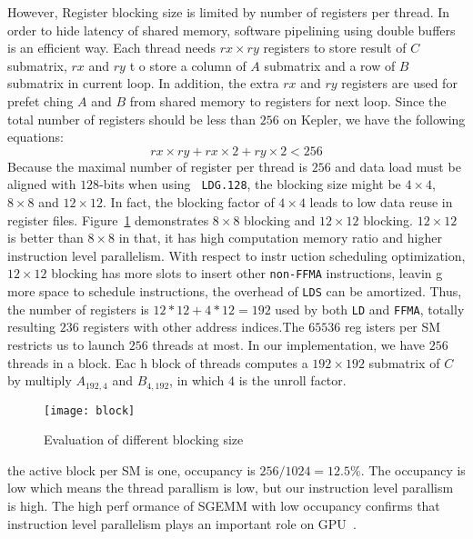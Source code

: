 However, Register blocking size is limited by number of registers per thread. 
In order to hide latency of shared memory, software pipelining using double
buffers is an efficient way. Each thread needs $rx\times ry$ registers to store result of $C$ submatrix, $rx$ and $ry$ t
o store a column of $A$
submatrix and a row of $B$ submatrix in current loop. In addition, the extra $rx$ and $ry$ registers are used for prefet
ching $A$ and $B$ from shared memory to
registers for next loop. Since the total number of registers should be less than $256$ on Kepler, we have the following 
equations:
\begin{equation}
    rx\times ry + rx\times 2 + ry\times 2 < 256
\label{f_register}
\end{equation}
Because the maximal number of register per thread is $256$ and data load must be aligned with $128$-bits when using {\tt
 LDG.128}, the blocking size might be $4\times 4$, $8\times 8$ and $12\times 12$. In fact, the blocking factor of 
 $4\times 4$ leads to low data reuse in register files. Figure~\ref{fig:block} demonstrates $8\times8$ blocking and 
 $12\times12$ blocking. $12\times12$ is better than
$8\times8$ in that, it has high computation memory ratio and higher instruction level parallelism. With respect to instr
uction scheduling optimization, $12\times12$ blocking has more slots to insert other {\tt non-FFMA} instructions, leavin
g more
space to schedule instructions, the overhead of {\tt LDS} can be amortized. Thus, the number of registers is $12*12+4*12
=192$ used by both {\tt LD} and {\tt FFMA}, totally resulting $236$ registers with other address indices.The $65536$ reg
isters per SM restricts us to launch $256$ threads at most. In our implementation, we have $256$ threads in a block. Eac
h block of threads computes a $192\times 192$ submatrix of $C$ by multiply $A_{192,4}$ and $B_{4, 192}$, in which $4$ is
 the unroll factor.

\begin{figure}[htbp]
\begin{center}
\texttt{[image: block]}
    \caption{Evaluation of different blocking size}
\label{fig:block}
\end{center}
\end{figure}
the active block per SM is one, occupancy is $256/1024=12.5\%$.
The occupancy is low which means the thread parallism is low, but our instruction level parallism is high. The high perf
ormance of SGEMM with low occupancy confirms that instruction level parallelism plays an important role on 
GPU~\cite{volkov2010better}.

